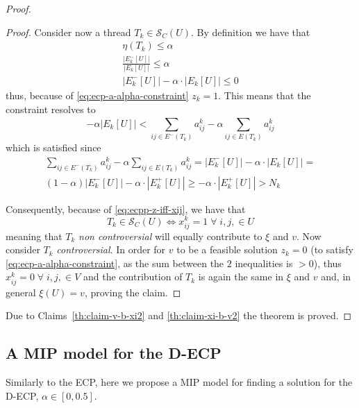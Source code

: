 \begin{proof}
\begin{proof}
		Consider now a thread $T_k \in \mathcal{S}_C(U)$. By definition we
		have that
		\begin{gather*}
			\eta(T_k) \leq \alpha \\
			\frac{|E^{-}_{k}[U]|}{|E_{k}[U]|} \leq \alpha \\
			|E^{-}_{k}[U]| - \alpha \cdot |E_{k}[U]| \leq 0
		\end{gather*}
		thus, because of \autoref{eq:ecp-a-alpha-constraint} $z_k = 1$. This
		means that the constraint resolves to
		\begin{equation*}
			-\alpha |E_{k}[U]| < \sum^{}_{ij \in E^{-} (T_k)} a_{ij}^{k}  - \alpha \sum^{}_{ij \in E(T_k)} a_{ij} ^{k}
		\end{equation*}
		which is satisfied since
		\begin{multline}
			\sum^{}_{ij \in E^{-} (T_k)} a_{ij}^{k}  - \alpha \sum^{}_{ij \in E(T_k)}
			a_{ij} ^{k} = |E^{-}_{k}[U]| - \alpha \cdot |E_{k}[U]| = \\
			(1- \alpha)|E^{-}_{k}[U]| - \alpha \cdot |E^{+}_{k}[U]| \geq -
			\alpha \cdot |E^{+}_{k}[U]| > N_k
		\end{multline}

		Consequently, because of \autoref{eq:ecpp-z-iff-xij}, we have that
		\begin{equation}
			T_k \in \mathcal{S}_C(U) \iff x_{ij}^{k} = 1 \; \forall \;i, j, \in U
		\end{equation}
		meaning that $T_k$ \emph{non controversial} will equally contribute to
		$\xi$ and $v$.
		Now consider $T_k$ \emph{controversial}. In order for $v$ to be a
		feasible solution $z_k = 0$ (to satisfy
		\autoref{eq:ecp-a-alpha-constraint}, as the sum between the $2$
		inequalities is $> 0$), thus $x_{ij}^{k} = 0 \; \forall \;i, j, \in V$
		and the contribution of $T_k$ is again the same in $\xi$ and $v$ and,
		in general $\xi(U) = v$, proving the claim.
	\end{proof}

	Due to Claims~\ref{th:claim-v-b-xi2} and \ref{th:claim-xi-b-v2} the theorem
	is proved.
\end{proof}

\subsection{A MIP model for the \acrshort{D-ECP}}%
\label{sub:a_mip_model_for_the_d_ecp}

Similarly to the \acrshort{ECP}, here we propose a \acrshort{MIP} model for
finding a solution for the \acrshort{D-ECP}, $\alpha \in [0, 0.5]$.

